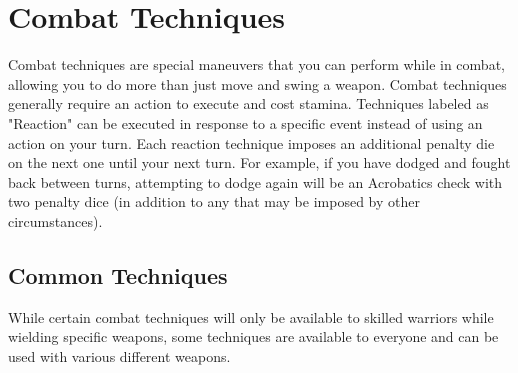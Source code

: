 \section{Combat Techniques}

Combat techniques are special maneuvers that you can perform while in combat, allowing you to do more than just move and swing a weapon. Combat techniques generally require an action to execute and cost stamina. Techniques labeled as "Reaction" can be executed in response to a specific event instead of using an action on your turn. Each reaction technique imposes an additional penalty die on the next one until your next turn. For example, if you have dodged and fought back between turns, attempting to dodge again will be an Acrobatics check with two penalty dice (in addition to any that may be imposed by other circumstances).

\subsection{Common Techniques}

While certain combat techniques will only be available to skilled warriors while wielding specific weapons, some techniques are available to everyone and can be used with various different weapons.


